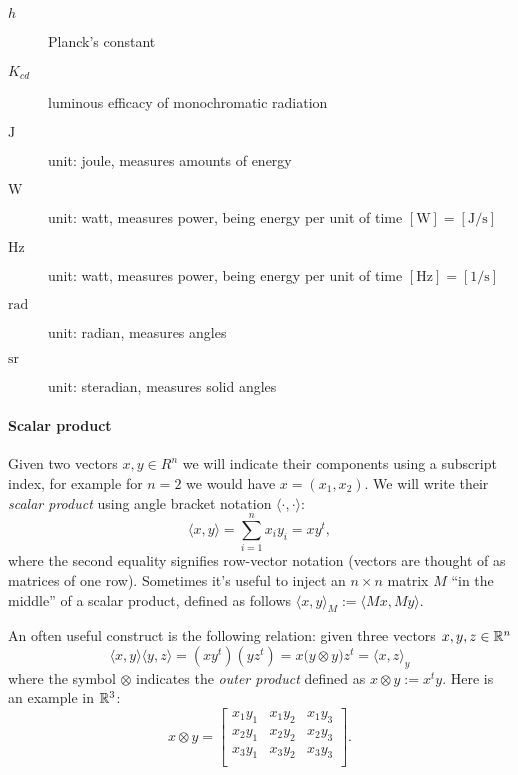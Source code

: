 \begin{description}
\item[ {$h$} ] Planck's constant
\item[ {$K_{cd}$} ] luminous efficacy of monochromatic radiation

\item[ {$\unit\joule$} ] unit: joule, measures amounts of energy
\item[ {$\unit\watt$} ] unit: watt, measures power, being energy per 
	unit of time $[\unit\watt] = [\unit{\joule\per\second}]$
\item[ {$\unit\hertz$} ] unit: watt, measures power, being energy per 
	unit of time $[\unit\hertz] = [\unit{1\per\second}]$
\item[ {$\unit\radian$} ] 	unit: radian, measures angles
\item[ {$\unit\steradian$} ] unit: steradian, measures solid angles
                   
\end{description}

\paragraph{Scalar product}

Given two vectors $x,y \in R^n$ we will indicate their components using a
subscript index,
for example for $n=2$ we would have $x = (x_1, x_2)$.
We will write their \textsl{scalar product} using angle bracket notation
$\langle \cdot, \cdot \rangle$:
\begin{displaymath}
\langle x, y \rangle = \sum_{i=1}^n x_i y_i = xy^t,
\end{displaymath}
where the second equality signifies row-vector notation (vectors are thought
of as matrices of one row). Sometimes it's useful to inject an $n\times n$ matrix $M$ ``in the middle''
of a scalar product, defined as follows $\langle x, y \rangle_M := \langle M x, M y \rangle$.

An often useful construct is the following relation: given
three vectors $x,y,z \in \mathbb{R}^n$
\begin{displaymath}
\langle x,y \rangle \langle y,z \rangle
  = \left(x y^t\right)\left(y z^t\right)
  = x \big(y \otimes y\big) z^t
  = \langle x, z\rangle_y
\end{displaymath}
where the symbol $\otimes$ indicates the \textsl{outer product} defined as $x\otimes y :=
x^t y$. Here is an example in $\mathbb{R}^3$:
\begin{displaymath}
x\otimes y =
\left[
\begin{array}{ccc}
x_1 y_1 & x_1 y_2 & x_1 y_3 \\
x_2 y_1 & x_2 y_2 & x_2 y_3 \\
x_3 y_1 & x_3 y_2 & x_3 y_3 \\
\end{array}
\right].
\end{displaymath}


